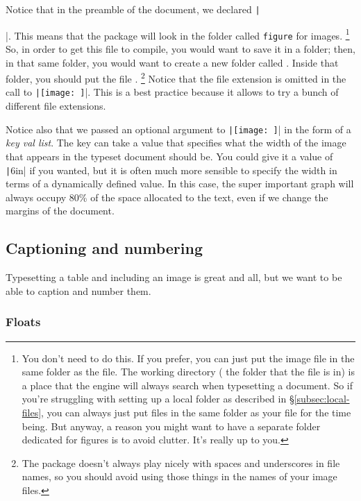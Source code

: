 Notice that in the preamble of the document, we declared \texttt|\graphicspath{ {figure/} }|.
This means that the package  will look in the folder called \texttt{figure} for images.%
\footnote{%
You don't need to do this.
If you prefer, you can just put the image file in the same folder as the  file.
The working directory (\IE{} the folder that the  file is in) is a place that the engine will always search when typesetting a document.
So if you're struggling with setting up a local  folder as described in \S\ref{subsec:local-files}, you can always just put files in the same folder as your  file for the time being.
But anyway, a reason you might want to have a separate folder dedicated for figures is to avoid clutter.
It's really up to you.%
}
So, in order to get this  file to compile, you would want to save it in a folder; then, in that same folder, you would want to create a new folder called .
Inside that folder, you should put the file .%
\footnote{%
The package  doesn't always play nicely with spaces and underscores in file names, so you should avoid using those things in the names of your image files.%
}
Notice that the file extension is omitted in the call to \texttt|\texttt{[image: ]}|.
This is a best practice because it allows  to try a bunch of different file extensions.

Notice also that we passed an optional argument to \texttt|\texttt{[image: ]}| in the form of a \textit{key val list}.
The key  can take a value that specifies what the width of the image that appears in the typeset document should be.
You could give it a value of \texttt|6in| if you wanted, but it is often much more sensible to specify the width in terms of a dynamically defined value.
In this case, the super important graph will always occupy 80\% of the space allocated to the text, even if we change the margins of the document.

\subsection{Captioning and numbering}
\label{subsec:captioning-and-numbering}

Typesetting a table and including an image is great and all, but we want to be able to caption and number them.

\subsubsection{Floats}
\label{subsubsec:floats}

